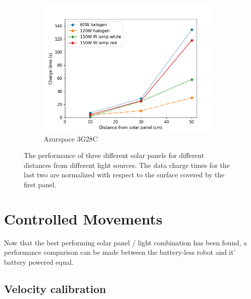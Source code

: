 \begin{figure}
\begin{subfigure}[b]{0.49\textwidth}
		\includegraphics[width=\textwidth]{pics/light_experiment_figure3.png}
		\caption{Azurspace 3G28C}
		\label{fig:light_exp3}
	\end{subfigure}
	\caption{The performance of three different solar panels for different distances from different light sources. The data charge times for the last two are normalized with respect to the surface covered by the first panel.}
\end{figure}


\section{Controlled Movements}
\label{sec:controlled_movements}





Now that the best performing solar panel / light combination has been found, a performance comparison can be made between the battery-less robot and it' battery powered equal.


\subsection{Velocity calibration}


